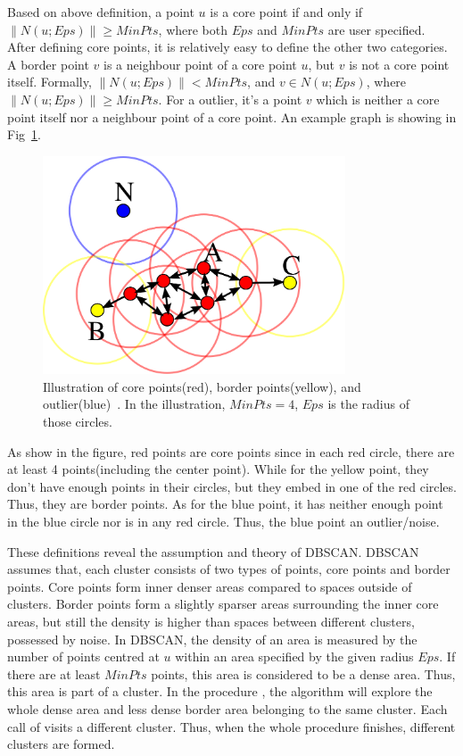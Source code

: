 Based on above definition, a point $u$ is a core point if and only if $\|N(u;Eps)\| \geq MinPts$, where both $Eps$ and $MinPts$ are user specified. After defining core points, it is relatively easy to define the other two categories. A border point $v$ is a neighbour point of a core point $u$, but $v$ is not a core point itself. Formally, $\|N(u;Eps)\| < MinPts$, and $v \in N(u;Eps)$, where $\|N(u;Eps)\| \geq MinPts$. For a outlier, it's a point $v$ which is neither a core point itself nor a neighbour point of a core point. An example graph is showing in Fig~\ref{fig:DBSCANConcept}.

\begin{figure}[ht]
	\begin{center}
		\includegraphics[width=0.8\textwidth]{images/DBSCAN-Illustration.png}
		\caption{Illustration of core points(red), border points(yellow), and outlier(blue)~\cite{wiki:DBSCAN}. In the illustration, $MinPts = 4$, $Eps$ is the radius of those circles.}
		\label{fig:DBSCANConcept}
	\end{center}
\end{figure}

As show in the figure, red points are core points since in each red circle, there are at least 4 points(including the center point). While for the yellow point, they don't have enough points in their circles, but they embed in one of the red circles. Thus, they are border points. As for the blue point, it has neither enough point in the blue circle nor is in any red circle. Thus, the blue point an outlier/noise.

These definitions reveal the assumption and theory of DBSCAN. DBSCAN assumes that, each cluster consists of two types of points, core points and border points. Core points form inner denser areas compared to spaces outside of clusters. Border points form a slightly sparser areas surrounding the inner core areas, but still the density is higher than spaces between different clusters, possessed by noise. In DBSCAN, the density of an area is measured by the number of points centred at $u$ within an area specified by the given radius $Eps$. If there are at least $MinPts$ points, this area is considered to be a dense area. Thus, this area is part of a cluster. In the procedure , the algorithm will explore the whole dense area and less dense border area belonging to the same cluster. Each call of  visits a different cluster. Thus, when the whole procedure  finishes, different clusters are formed.

